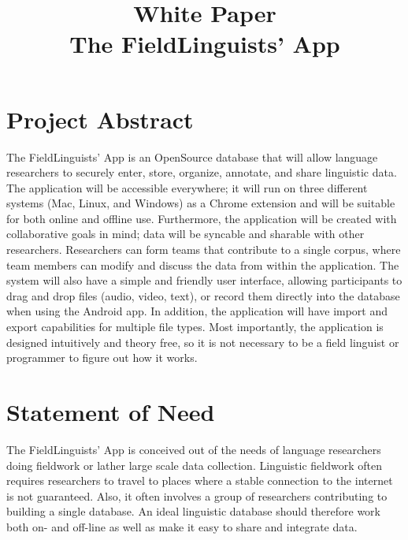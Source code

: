 \documentclass[12 pt]{article}
\title{White Paper \\ The FieldLinguists' App}
\author{}
\date{}
\begin{document}
\maketitle{} 


\section {Project Abstract}

The FieldLinguists' App is an OpenSource database that will allow language researchers to securely enter, store, organize, annotate, and share linguistic data. The application will be accessible everywhere; it will run on three different systems (Mac, Linux, and Windows) as a Chrome extension and will be suitable for both online and offline use.  Furthermore, the application will be created with collaborative goals in mind;  data will be syncable and sharable with other researchers.  Researchers can form teams that contribute to a single corpus, where team members can modify and discuss the data from within the application. The system will also have a simple and friendly user interface, allowing participants to drag and drop files (audio, video, text), or record them directly into the database when using the Android app. In addition, the application will have import and export capabilities for multiple file types.  Most importantly, the application is designed intuitively and theory free, so it is not necessary to be a field linguist or programmer to figure out how it works.


\section {Statement of Need}

The FieldLinguists' App is conceived out of the needs of language researchers doing fieldwork or lather large scale data collection. Linguistic fieldwork often requires researchers to travel to places where a stable connection to the internet is not guaranteed. Also, it often involves a group of researchers contributing to building a single database.
 An ideal linguistic database should therefore work both on- and off-line as well as make it easy to share and integrate data. 
 
\end{document}
